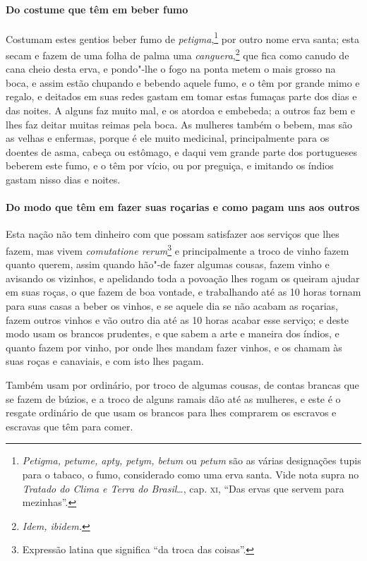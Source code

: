 \paragraph{Do costume que têm em beber fumo}

Costumam estes gentios beber fumo de \textit{petigma},\footnote{ \textit{Petigma, 
petume, apty, petym, betum} ou \textit{petum} são as várias designações tupis para o tabaco, o fumo,
considerado como uma erva santa. Vide nota supra no \textit{Tratado do
Clima e Terra do Brasil}\ldots{}, cap. \textsc{xi}, ``Das ervas que servem
para mezinhas''.} por outro nome erva santa; esta
secam e fazem de uma folha de palma uma \textit{canguera},\footnote{ \textit{Idem, ibidem.}} 
que fica como canudo de cana cheio desta erva, e pondo"-lhe o fogo na ponta metem o mais grosso na boca, e
assim estão chupando e bebendo aquele fumo, e o têm por grande mimo e
regalo, e deitados em suas redes gastam em tomar estas fumaças parte
dos dias e das noites. A alguns faz muito mal, e os atordoa e embebeda;
a outros faz bem e lhes faz deitar muitas reimas pela boca. As mulheres
também o bebem, mas são as velhas e enfermas, porque é ele muito
medicinal, principalmente para os doentes de asma, cabeça ou estômago,
e daqui vem grande parte dos portugueses beberem este fumo, e o têm por
vício, ou por preguiça, e imitando os índios gastam nisso dias e noites.

\paragraph{Do modo que têm em fazer suas roçarias e como pagam uns aos outros}

Esta nação não tem dinheiro com que possam satisfazer aos
serviços que lhes fazem, mas vivem \textit{comutatione rerum}\footnote{ Expressão latina que significa ``da troca das coisas''.} e
principalmente a troco de vinho fazem quanto querem, assim quando
hão"-de fazer algumas cousas, fazem vinho e avisando os vizinhos, e
apelidando toda a povoação lhes rogam os queiram ajudar em suas roças,
o que fazem de boa vontade, e trabalhando até as 10 horas tornam para
suas casas a beber os vinhos, e se aquele dia se não acabam as
roçarias, fazem outros vinhos e vão outro dia até as 10 horas acabar
esse serviço; e deste modo usam os brancos prudentes, e que sabem a
arte e maneira dos índios, e quanto fazem por vinho, por onde lhes
mandam fazer vinhos, e os chamam às suas roças e canaviais, e com isto lhes pagam.

 Também usam por ordinário, por troco de algumas cousas, de contas
brancas que se fazem de búzios, e a troco de alguns ramais dão até as
mulheres, e este é o resgate ordinário de que usam os brancos para lhes
comprarem os escravos e escravas que têm para comer.

